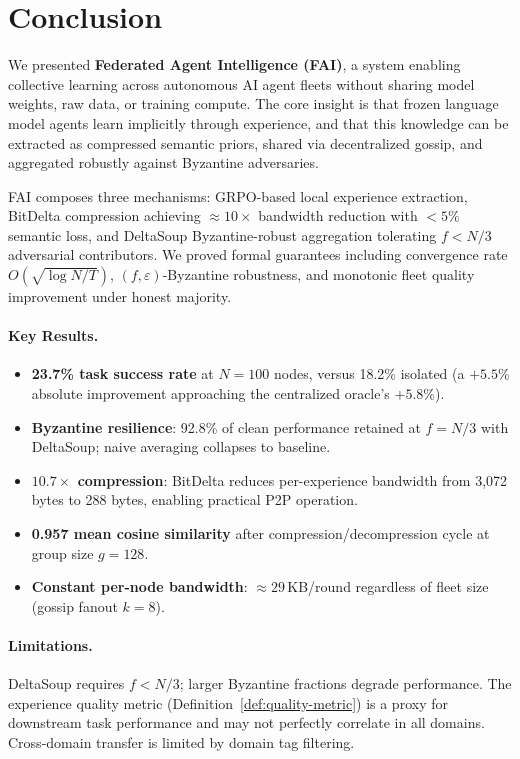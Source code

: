 \section{Conclusion}

\label{sec:conclusion}

We presented \textbf{Federated Agent Intelligence (FAI)}, a system enabling
collective learning across autonomous AI agent fleets without sharing model
weights, raw data, or training compute. The core insight is that frozen
language model agents learn implicitly through experience, and that this
knowledge can be extracted as compressed semantic priors, shared via
decentralized gossip, and aggregated robustly against Byzantine adversaries.

FAI composes three mechanisms: GRPO-based local experience extraction,
BitDelta compression achieving ${\approx}10\times$ bandwidth reduction with
$<5\%$ semantic loss, and DeltaSoup Byzantine-robust aggregation tolerating
$f < N/3$ adversarial contributors. We proved formal guarantees including
convergence rate $O(\sqrt{\log N / T})$, $(f,\varepsilon)$-Byzantine robustness,
and monotonic fleet quality improvement under honest majority.

\paragraph{Key Results.}
\begin{itemize}[leftmargin=1.5em]
    \item \textbf{23.7\% task success rate} at $N=100$ nodes, versus 18.2\%
          isolated (a $+5.5\%$ absolute improvement approaching the centralized
          oracle's $+5.8\%$).
    \item \textbf{Byzantine resilience}: 92.8\% of clean performance retained
          at $f = N/3$ with DeltaSoup; naive averaging collapses to baseline.
    \item \textbf{$10.7\times$ compression}: BitDelta reduces per-experience
          bandwidth from 3,072 bytes to 288 bytes, enabling practical P2P operation.
    \item \textbf{0.957 mean cosine similarity} after compression/decompression
          cycle at group size $g = 128$.
    \item \textbf{Constant per-node bandwidth}: ${\approx}29$\,KB/round
          regardless of fleet size (gossip fanout $k=8$).
\end{itemize}

\paragraph{Limitations.}
DeltaSoup requires $f < N/3$; larger Byzantine fractions degrade performance.
The experience quality metric (Definition~\ref{def:quality-metric}) is a proxy
for downstream task performance and may not perfectly correlate in all domains.
Cross-domain transfer is limited by domain tag filtering.

